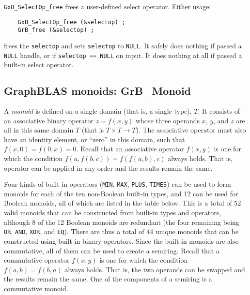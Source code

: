 \documentclass[12pt]{article}
\begin{document}
\verb'GxB_SelectOp_free' frees a user-defined select operator.  Either usage:

    {\small
    \begin{verbatim}
    GxB_SelectOp_free (&selectop) ;
    GrB_free (&selectop) ; \end{verbatim}}

\noindent
frees the \verb'selectop' and sets \verb'selectop' to \verb'NULL'.  It safely
does nothing if passed a \verb'NULL' handle, or if \verb'selectop == NULL' on
input.  It does nothing at all if passed a built-in select operator.

\newpage
\subsection{GraphBLAS monoids: {\sf GrB\_Monoid}} %
\label{monoid}

A {\em monoid} is defined on a single domain (that is, a single type), $T$.  It
consists of an associative binary operator $z=f(x,y)$ whose three operands $x$,
$y$, and $z$ are all in this same domain $T$ (that is $T \times T \rightarrow
T$).  The associative operator must also have an identity element, or ``zero''
in this domain, such that $f(x,0)=f(0,x)=0$.  Recall that an associative
operator $f(x,y)$ is one for which the condition $f(a, f(b,c)) = f(f (a,b),c)$
always holds.  That is, operator can be applied in any order and the results
remain the same.

Four kinds of built-in operators (\verb'MIN', \verb'MAX', \verb'PLUS',
\verb'TIMES') can be used to form monoids for each of the ten non-Boolean
built-in types, and 12 can be used for Boolean monoids, all of which are listed
in the table below.  This is a total of 52 valid monoids that can be
constructed from built-in types and operators, although 8 of the 12 Boolean
monoids are redundant (the four remaining being \verb'OR', \verb'AND',
\verb'XOR', and \verb'EQ').  There are thus a total of 44 unique monoids that
can be constructed using built-in binary operators.  Since the built-in monoids
are also commutative, all of them can be used to create a semiring.  Recall
that a commutative operator $f(x,y)$ is one for which the condition
$f(a,b)=f(b,a)$ always holds.  That is, the two operands can be swapped and the
results remain the same.  One of the components of a semiring is a commutative
monoid.
\end{document}
